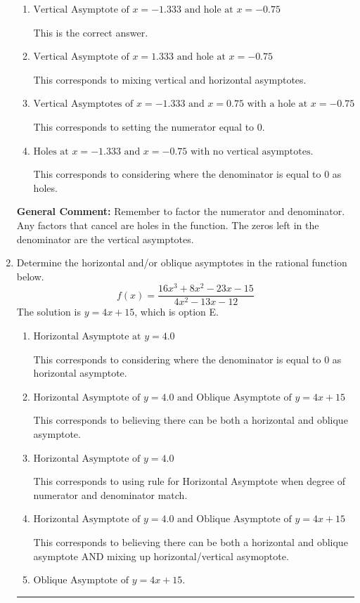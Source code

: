\documentclass{extbook}[14pt]
\newcommand{\litem}[1]{\item #1

\rule{\textwidth}{0.4pt}}
\begin{document}
\begin{enumerate}
{\begin{enumerate}[label=\Alph*.]
This corresponds to not factoring out the hole.
\item \( \text{Vertical Asymptote of } x = -1.333 \text{ and hole at } x = -0.75 \)

This is the correct answer.
\item \( \text{Vertical Asymptote of } x = 1.333 \text{ and hole at } x = -0.75 \)

This corresponds to mixing vertical and horizontal asymptotes.
\item \( \text{Vertical Asymptotes of } x = -1.333 \text{ and } x = 0.75 \text{ with a hole at } x = -0.75 \)

This corresponds to setting the numerator equal to 0.
\item \( \text{Holes at } x = -1.333 \text{ and } x = -0.75 \text{ with no vertical asymptotes.} \)

This corresponds to considering where the denominator is equal to 0 as holes.
\end{enumerate}

\textbf{General Comment:} Remember to factor the numerator and denominator. Any factors that cancel are holes in the function. The zeros left in the denominator are the vertical asymptotes.
}
\litem{
Determine the horizontal and/or oblique asymptotes in the rational function below.
\[ f(x) = \frac{16x^{3} +8 x^{2} -23 x -15}{4x^{2} -13 x -12} \]The solution is \( y = 4x + 15 \), which is option E.\begin{enumerate}[label=\Alph*.]
\item \( \text{Horizontal Asymptote at } y = 4.0 \)

This corresponds to considering where the denominator is equal to 0 as horizontal asymptote.
\item \( \text{Horizontal Asymptote of } y = 4.0 \text{ and Oblique Asymptote of } y = 4x + 15 \)

This corresponds to believing there can be both a horizontal and oblique asymptote.
\item \( \text{Horizontal Asymptote of } y = 4.0  \)

This corresponds to using rule for Horizontal Asymptote when degree of numerator and denominator match.
\item \( \text{Horizontal Asymptote of } y = 4.0 \text{ and Oblique Asymptote of } y = 4x + 15 \)

This corresponds to believing there can be both a horizontal and oblique asymptote AND mixing up horizontal/vertical asymoptote.
\item \( \text{Oblique Asymptote of } y = 4x + 15. \)


\end{enumerate}}
\end{enumerate}
\end{document}
